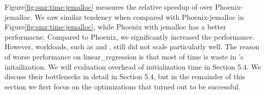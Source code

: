 Figure\ref{fig:smr:time:jemalloc} measures the relative speedup of \myds over Phoenix-jemalloc. 
We saw similar tendency when compared with Phoenix-jemalloc in Figure\ref{fig:smr:time:jemalloc}, while Phoenix with jemalloc has a better performacne.
Compared to Phoenix, we significantly increased the performance.
However, workloads, such as  and , still did not scale particularly well. 
The reason of worse performance on linear\_regression is that most of time is waste in \myds's initailization.
We will evaluation overhead of initialization time in Section 5.4.
We discuss their bottlenecks in detail in Section 5.4, but in the remainder of this section we first focus on the optimizations that turned out to be successful.



%






